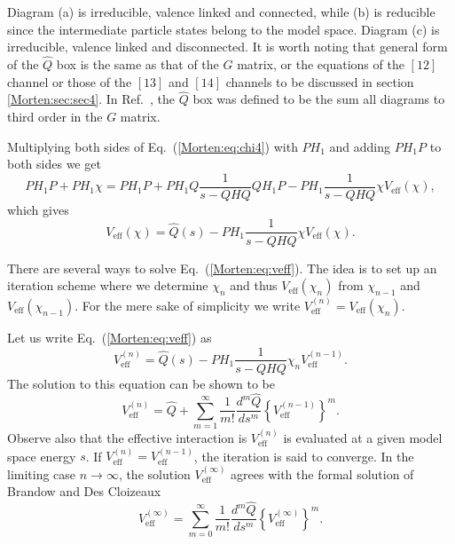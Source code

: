 Diagram (a) is irreducible, valence linked and connected, 
while (b) is reducible since 
the intermediate particle states belong to the model space. 
Diagram (c) is irreducible, valence linked and disconnected. 
It is worth noting that general form of the $\hat{Q}$ box
is the same as that of the $G$ matrix, or the equations
of the $[12]$ channel or those of the $[13]$ and $[14]$
channels to be discussed in section \ref{Morten:sec:sec4}.
In Ref.~, the $\hat{Q}$ box was defined
to be the sum all diagrams to third order in the $G$ matrix.


Multiplying both sides of Eq.~(\ref{Morten:eq:chi4}) with $PH_1$ and
adding $PH_1 P$ to both sides we get
\[
    PH_1 P + PH_1 \chi =
    PH_1 P + PH_1 Q\frac{1}{s - QHQ}QH_1 P -
    PH_1 \frac{1}{s -QHQ}\chi V_{\mathrm{eff}}(\chi ),
\]
which gives
\begin{equation}
     V_{\mathrm{eff}}(\chi )=\hat{Q}(s)-
     PH_1 \frac{1}{s -QHQ}\chi V_{\mathrm{eff}}(\chi ).
     \label{Morten:eq:veff}
\end{equation}

There are several ways to solve Eq.~(\ref{Morten:eq:veff}). The idea is
to set up an iteration scheme where we determine $\chi_n$ and
thus $V_{\mathrm{eff}}(\chi_n )$ from 
$\chi_{n-1}$ and $V_{\mathrm{eff}}(\chi_{n-1})$.
For the mere sake of simplicity we write 
$V_{\mathrm{eff}}^{(n)}=V_{\mathrm{eff}}(\chi_{n})$.

Let us write Eq.~(\ref{Morten:eq:veff}) as
\[
   V_{\mathrm{eff}}^{(n)}=\hat{Q}(s)-
   PH_1 \frac{1}{s -QHQ}\chi_n V_{\mathrm{eff}}^{(n-1)}.
\]
The solution to this equation can be shown to be \cite{Morten:ls80}
\begin{equation}
    V_{\mathrm{eff}}^{(n)}=\hat{Q}+{\displaystyle\sum_{m=1}^{\infty}}
    \frac{1}{m!}\frac{d^m\hat{Q}}{ds^m}\left\{
    V_{\mathrm{eff}}^{(n-1)}\right\}^m . 
    \label{Morten:eq:fd}
\end{equation}
Observe also that the
effective interaction is $V_{\mathrm{eff}}^{(n)}$ 
is evaluated at a given model space energy
$s$. If
$V_{\mathrm{eff}}^{(n)}=V_{\mathrm{eff}}^{(n-1)}$, the iteration is said to
converge. In the limiting case $n\rightarrow \infty$, the
solution $V_{\mathrm{eff}}^{(\infty)}$ agrees with the formal solution of
Brandow
\cite{Morten:brandow67} and Des Cloizeaux \cite{Morten:des}
\begin{equation}
    V_{\mathrm{eff}}^{(\infty)}=\sum_{m=0}^{\infty}\frac{1}{m!}
    \frac{d^{m}\hat{Q}}{ds^{m}}\left\{
    V_{\mathrm{eff}}^{(\infty)}\right\}^{m}.\label{Morten:eq:pert}
\end{equation}



